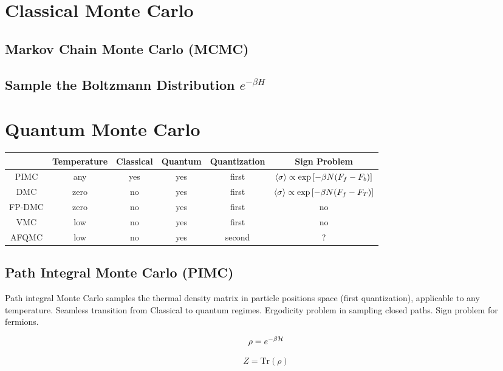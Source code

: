 \section{Classical Monte Carlo}
\subsection{Markov Chain Monte Carlo (MCMC)}
\subsection{Sample the Boltzmann Distribution $e^{-\beta H}$}

\section{Quantum Monte Carlo}
\begin{table}[h]
\centering
\begin{tabular}{cccccc}
\toprule
     & Temperature & Classical & Quantum & Quantization & Sign Problem \\
\midrule
PIMC &     any     &   yes     &   yes   & first & $\braket{\sigma}\propto \exp\left[ -\beta N (F_f-F_b) \right]$ \\
DMC  &    zero     &    no     &   yes   & first & $\braket{\sigma}\propto \exp\left[ -\beta N (F_f-F_T) \right]$ \\
FP-DMC & zero & no & yes & first & no \\
VMC & low & no & yes & first & no \\
AFQMC & low & no & yes & second & ? \\
\bottomrule
\end{tabular}
\end{table}

\subsection{Path Integral Monte Carlo (PIMC)}
Path integral Monte Carlo samples the thermal density matrix in particle positions space (first quantization), applicable to any temperature. Seamless transition from Classical to quantum regimes. Ergodicity problem in sampling closed paths. Sign problem for fermions.

\begin{equation}
\rho = e^{-\beta \mathcal{H}}
\end{equation}

\begin{equation}
Z = \text{Tr} \left( \rho \right)
\end{equation}

